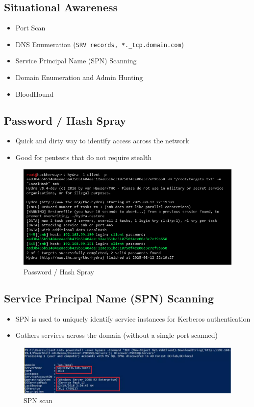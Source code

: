 \subsection{Situational Awareness}
\begin{itemize}
    \item Port Scan
    \item DNS Enumeration (\texttt{SRV records, *.\_tcp.domain.com})
    \item Service Principal Name (SPN) Scanning
    \item Domain Enumeration and Admin Hunting
    \item BloodHound
\end{itemize}

\subsection{Password / Hash Spray}
\begin{itemize}
    \item Quick and dirty way to identify access across the network
    \item Good for pentests that do not require stealth
\end{itemize}
\begin{figure}
    \centering
    \includegraphics[width=0.75\linewidth]{spray.png}
    \caption{Password / Hash Spray}
    \label{fig:placeholder}
\end{figure}
\subsection{Service Principal Name (SPN) Scanning}
\begin{itemize}
    \item SPN is used to uniquely identify service instances for Kerberos authentication
    \item Gathers services across the domain (without a single port scanned)
\end{itemize}
\begin{figure}
    \centering
    \includegraphics[width=0.75\linewidth]{spnscan.png}
    \caption{SPN scan}
    \label{fig:placeholder}
\end{figure}
